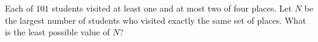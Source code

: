 Each of $101$ students visited at least one and at most two of four places. Let $N$ be the largest number of students who visited exactly the same set of places. What is the least possible value of $N$?
